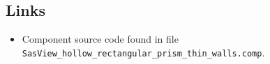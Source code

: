 \subsection*{Links}
\begin{itemize}
  \item Component source code found in file \texttt{SasView\_hollow\_rectangular\_prism\_thin\_walls.comp}.
\end{itemize}
